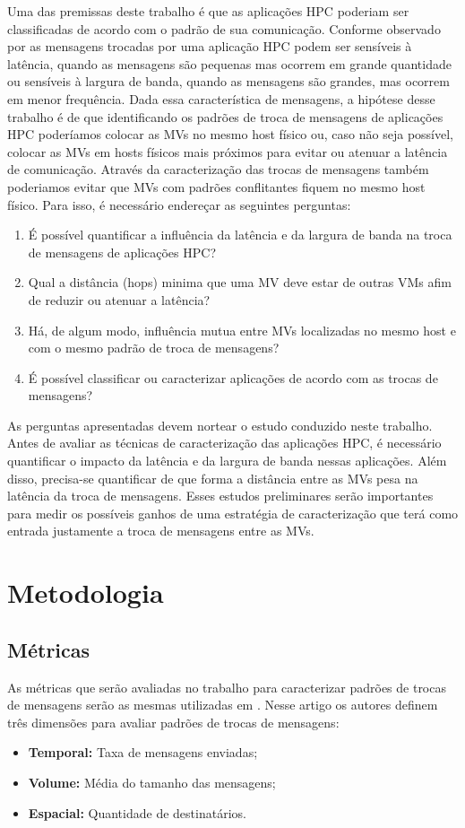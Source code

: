 \documentclass[10pt, conference, compsocconf]{IEEEtran}
\begin{document}
Uma das premissas deste trabalho é que as aplicações HPC poderiam ser classificadas de acordo com o padrão de sua comunicação. Conforme observado por \citet{Gupta:2014} as mensagens trocadas por uma aplicação HPC podem ser sensíveis à latência, quando as mensagens são pequenas mas ocorrem em grande quantidade ou sensíveis à largura de banda, quando as mensagens são grandes, mas ocorrem em menor frequência. Dada essa característica de mensagens, a hipótese desse trabalho é de que identificando os padrões de troca de mensagens de aplicações HPC poderíamos colocar as MVs no mesmo host físico ou, caso não seja possível, colocar as MVs em hosts físicos mais próximos para evitar ou atenuar a latência de comunicação. Através da caracterização das trocas de mensagens também poderiamos evitar que MVs com padrões conflitantes fiquem no mesmo host físico. Para isso, é necessário endereçar as seguintes perguntas:
\begin{enumerate}
    \item É possível quantificar a influência da latência e da largura de banda na troca de mensagens de aplicações HPC?
    \item Qual a distância (hops) minima que uma MV deve estar de outras VMs afim de reduzir ou atenuar a latência? 
    \item Há, de algum modo, influência mutua entre MVs localizadas no mesmo host e com o mesmo padrão de troca de mensagens?
    \item É possível classificar ou caracterizar aplicações de acordo com as trocas de mensagens?
\end{enumerate}

As perguntas apresentadas devem nortear o estudo conduzido neste trabalho. Antes de avaliar as técnicas de caracterização das aplicações HPC, é necessário quantificar o impacto da latência e da largura de banda nessas aplicações. Além disso, precisa-se quantificar de que forma a distância entre as MVs pesa na latência da troca de mensagens. Esses estudos preliminares serão importantes para medir os possíveis ganhos de uma estratégia de caracterização que terá como entrada justamente a troca de mensagens entre as MVs.

\section{Metodologia}


\subsection{Métricas}
As métricas que serão avaliadas no trabalho para caracterizar padrões de trocas de mensagens serão as mesmas utilizadas em \citet{Chao:2008}. Nesse artigo os autores definem três dimensões para avaliar padrões de trocas de mensagens:
\begin{itemize}
    \item \textbf{Temporal:} Taxa de mensagens enviadas;
    \item \textbf{Volume:} Média do tamanho das mensagens;
    \item \textbf{Espacial:} Quantidade de destinatários.
\end{itemize}
\end{document}
